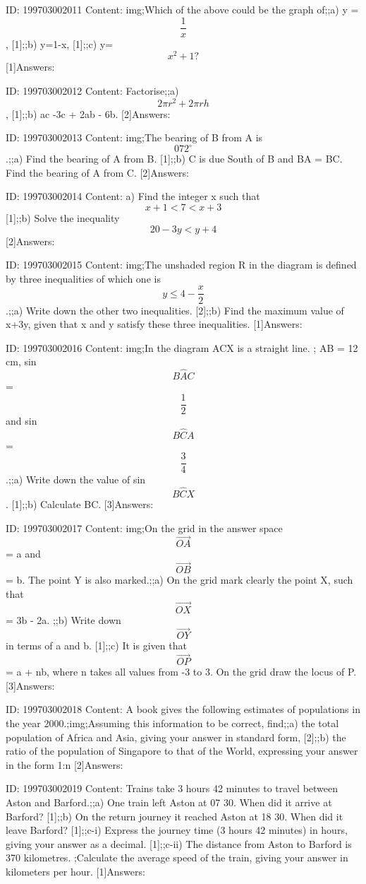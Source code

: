 \documentclass{article}
\begin{document}
ID: 199703002011
Content:
img;Which of the above could be the graph of;;a) y = $$\frac{1}{x}$$, [1];;b) y=1-x, [1];;c) y=$$x^2+1?$$ [1]Answers:

ID: 199703002012
Content:
Factorise;;a) $$2\pi r^2+2\pi rh$$, [1];;b) ac -3c + 2ab - 6b. [2]Answers:

ID: 199703002013
Content:
img;The bearing of B from A is $$072^{\circ}$$.;;a) Find the bearing of A from B. [1];;b) C is due South of B and BA = BC. Find the bearing of A from C. [2]Answers:

ID: 199703002014
Content:
a) Find the integer x such that $$x+1<7<x+3$$ [1];;b) Solve the inequality $$20-3y < y+4$$ [2]Answers:

ID: 199703002015
Content:
img;The unshaded region R in the diagram is defined by three inequalities of which one is $$y\leq 4-\frac{x}{2}$$.;;a) Write down the other two inequalities. [2];;b) Find the maximum value of x+3y, given that x and y satisfy these three inequalities. [1]Answers:

ID: 199703002016
Content:
img;In the diagram ACX is a straight line. ; AB = 12 cm, sin $$B \hat AC$$ = $$\frac{1}{2}$$ and sin $$B \hat CA$$= $$\frac{3}{4}$$.;;a) Write down the value of sin $$B \hat CX$$. [1];;b) Calculate BC. [3]Answers:

ID: 199703002017
Content:
img;On the grid in the answer space $$\vec{OA}$$ = a and $$\vec{OB}$$ = b. The point Y is also marked.;;a) On the grid mark clearly the point X, such that $$\vec{OX}$$ = 3b - 2a. ;;b) Write down $$\vec{OY}$$ in terms of a and b. [1];;c) It is given that $$\vec{OP}$$ = a + nb, where n takes all values from -3 to 3. On the grid draw the locus of P. [3]Answers:

ID: 199703002018
Content:
A book gives the following estimates of populations in the year 2000.;img;Assuming this information to be correct, find;;a) the total population of Africa and Asia, giving your answer in standard form,  [2];;b) the ratio of the population of Singapore to that of the World, expressing your answer in the form 1:n [2]Answers:

ID: 199703002019
Content:
Trains take 3 hours 42 minutes to travel between Aston and Barford.;;a) One train left Aston at 07 30. When did it arrive at Barford? [1];;b) On the return journey it reached Aston at 18 30. When did it leave Barford? [1];;c-i) Express the journey time (3 hours 42 minutes) in hours, giving your answer as a decimal. [1];;c-ii) The distance from Aston to Barford is 370 kilometres. ;Calculate the average speed of the train, giving your answer in kilometers per hour. [1]Answers:
\end{document}
